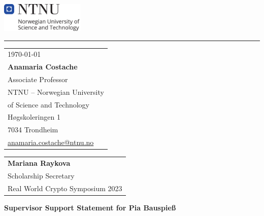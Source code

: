 \documentclass{article}
\begin{document}

\includegraphics[width=0.3\textwidth]{ntnu_hoeyde_eng.pdf} %

\vspace{-1em} %

\rule{\linewidth}{1pt} %

\bigskip%


\hfill
\begin{tabular}{l @{}}
	\today \bigskip\\ %
    \textbf{Anamaria Costache} \\
    Associate Professor \\
	NTNU -- Norwegian University\\of Science and Technology \\ %
	Høgskoleringen 1\\ 7034 Trondheim \\
	\href{mailto:anamaria.costache@ntnu.no}{anamaria.costache@ntnu.no}\\
\end{tabular}

\bigskip %


\begin{tabular}{@{} l}
	\textbf{Mariana Raykova} \\
	  Scholarship Secretary \\
	Real World Crypto Symposium 2023
\end{tabular}

\bigskip %

\textbf{Supervisor Support Statement for Pia Bauspieß}
\end{document}
